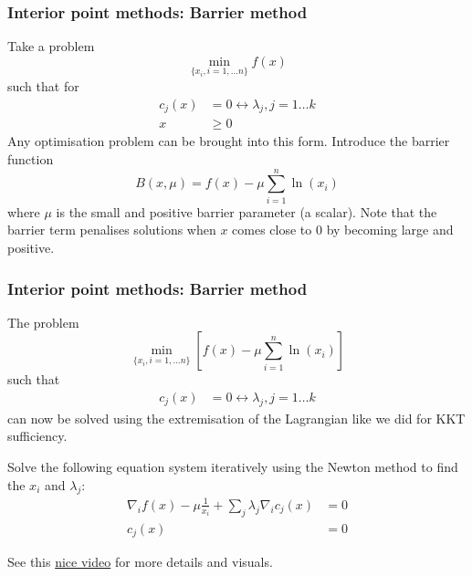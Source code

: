 \documentclass[10pt,aspectratio=169,dvipsnames]{beamer}
\def\l{\lambda}
\def\m{\mu}
\begin{document}
\begin{frame}
  \frametitle{Interior point methods: Barrier method}

 Take a problem
  \begin{equation*}
    \min_{\{x_i, i=1,\dots n\}} f(x)
  \end{equation*}
such that for
\begin{align*}
  c_j(x) & = 0 \leftrightarrow \l_j, j = 1\dots k \\
  x & \geq 0
\end{align*}
Any optimisation problem can be brought into this form. Introduce the \alert{barrier function}
\begin{equation*}
 B(x,\mu) = f(x) - \m \sum_{i=1}^n \ln(x_i)
\end{equation*}
where $\mu$ is the small and positive \alert{barrier parameter} (a scalar). Note that the barrier term penalises solutions when $x$ comes close to 0 by becoming large and positive.
\end{frame}



\begin{frame}
  \frametitle{Interior point methods: Barrier method}

  The problem
\begin{equation*}
  \min_{\{x_i, i=1,\dots n\}} \left[ f(x) - \m \sum_{i=1}^n \ln(x_i)  \right]
\end{equation*}
such that
\begin{align*}
  c_j(x) & = 0 \leftrightarrow \l_j, j = 1\dots k
\end{align*}
can now be solved using the extremisation of the Lagrangian like we did for KKT sufficiency.

Solve the following equation system iteratively using the Newton method to find the $x_i$ and $\lambda_j$:
\begin{align*}
    \nabla_i f(x) - \m  \frac{1}{x_i} + \sum_j \lambda_j \nabla_i c_j(x) & = 0 \\
  c_j(x) & = 0
\end{align*}

See this \href{https://www.youtube.com/watch?v=zm4mfr-QT1E}{nice video} for more details and visuals.
\end{frame}
\end{document}
